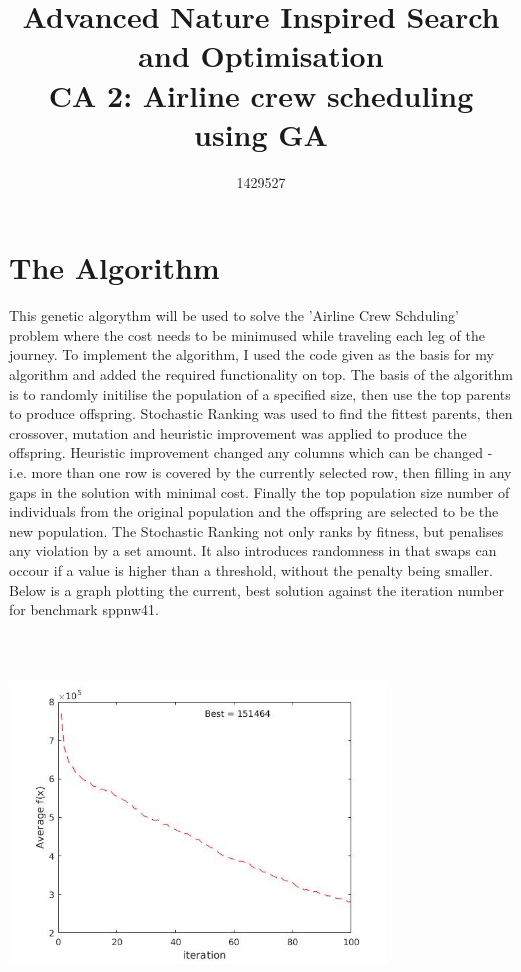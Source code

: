 \documentclass{article}
\begin{document}
\title{%
  Advanced Nature Inspired Search and Optimisation  \\
  \large CA 2: Airline crew scheduling using GA  \\
    }

\author{1429527}

\maketitle

\section{The Algorithm}

This genetic algorythm will be used to solve the 'Airline Crew Schduling' problem where the cost needs to be minimused while traveling each leg of the journey.
\smallbreak
To implement the algorithm, I used the code given \cite{Shan} as the basis for my algorithm and added the required functionality on top. 
\smallbreak
The basis of the algorithm is to randomly initilise the population of a specified size, then use the top parents to produce offspring. Stochastic Ranking was used to find the fittest parents, then crossover, mutation and heuristic improvement was applied to produce the offspring. Heuristic improvement changed any columns which can be changed - i.e. more than one row is covered by the currently selected row, then filling in any gaps in the solution with minimal cost. Finally the top population size number of individuals from the original population and the offspring are selected to be the new population. 
\smallbreak
The Stochastic Ranking not only ranks by fitness, but penalises any violation by a set amount. It also introduces randomness in that swaps can occour if a value is higher than a threshold, without the penalty being smaller.
\smallbreak
Below is a graph plotting the current, best solution against the iteration number for benchmark sppnw41.

\includegraphics[width=10cm,height=10cm,keepaspectratio]{41Graph}
\end{document}
